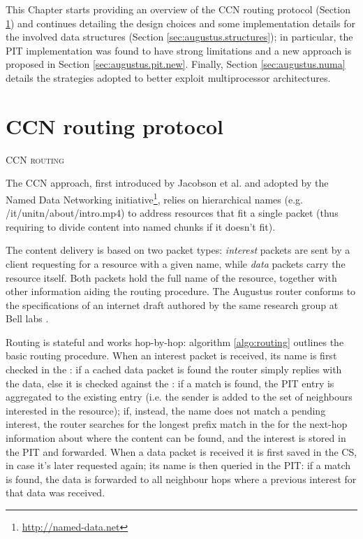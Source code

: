 \documentclass[11pt,a4paper,twoside,titlepage,openany]{book}
\newcommand{\mono}[1]{{\footnotesize \ttfamily #1}}
\begin{document}
This Chapter starts providing an overview of the CCN routing protocol (Section \ref{sec:augustus.ccn}) and continues detailing the design choices and some implementation details for the involved data structures (Section \ref{sec:augustus.structures});
in particular, the \gls{PIT} implementation was found to have strong limitations and a new approach is proposed in Section \ref{sec:augustus.pit.new}.
Finally, Section \ref{sec:augustus.numa} details the strategies adopted to better exploit multiprocessor architectures.

\section{CCN routing protocol}\label{sec:augustus.ccn}
\begin{algorithm}[tb]
  \DontPrintSemicolon
  \caption[CCN routing]{\textsc{CCN routing}}
  \label{algo:routing}
\end{algorithm}

The \gls{CCN} approach, first introduced by Jacobson et al. \cite{ccn} and adopted by the Named Data Networking initiative\footnote{\url{http://named-data.net}}, relies on hierarchical names (e.g. \mono{/it/unitn/\allowbreak about/intro.mp4}) to address resources that fit a single packet (thus requiring to divide content into named chunks if it doesn't fit).

The content delivery is based on two packet types: \emph{interest} packets are sent by a client requesting for a resource with a given name, while \emph{data} packets carry the resource itself. Both packets hold the full name of the resource, together with other information aiding the routing procedure.
The Augustus router conforms to the specifications of an internet draft authored by the same research group at Bell labs \cite{icn-packet}.

Routing is stateful and works hop-by-hop: algorithm \ref{algo:routing} outlines the basic routing procedure. When an interest packet is received, its name is first checked in the : if a cached data packet is found the router simply replies with the data, else it is checked against the : if a match is found, the PIT entry is aggregated to the existing entry (i.e. the sender is added to the set of neighbours interested in the resource); if, instead, the name does not match a pending interest, the router searches for the longest prefix match in the  for the next-hop information about where the content can be found, and the interest is stored in the PIT and forwarded.
When a data packet is received it is first saved in the CS, in case it's later requested again; its name is then queried in the PIT: if a match is found, the data is forwarded to all neighbour hops where a previous interest for that data was received.
\end{document}
